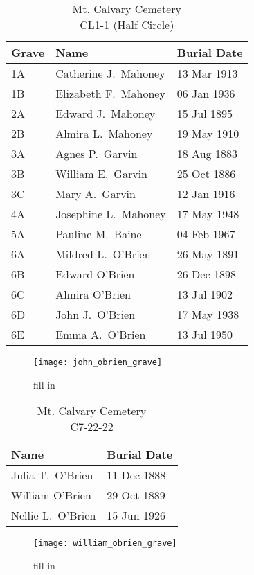\begin{table}[h]
	\centering
	\caption{Mt. Calvary Cemetery \\
		CL1-1 (Half Circle)}
	\begin{tabular}{|l|l|l|}
		\hline
		\textbf{Grave} & \textbf{Name} & \textbf{Burial Date} \\
		\hline
		1A & Catherine J.\ Mahoney & 13 Mar 1913 \\
		\hline
		1B & Elizabeth F.\ Mahoney & 06 Jan 1936 \\
		\hline
		2A & Edward J.\ Mahoney & 15 Jul 1895 \\
		\hline
		2B & Almira L.\ Mahoney & 19 May 1910 \\
		\hline
		3A & Agnes P.\ Garvin & 18 Aug 1883 \\
		\hline
		3B & William E.\ Garvin & 25 Oct 1886 \\
		\hline
		3C & Mary A.\ Garvin & 12 Jan 1916 \\
		\hline
		4A & Josephine L.\ Mahoney & 17 May 1948 \\
		\hline
		5A & Pauline M.\ Baine & 04 Feb 1967 \\
		\hline
		6A & Mildred L.\ O'Brien & 26 May 1891 \\
		\hline
		6B & Edward O'Brien & 26 Dec 1898 \\
		\hline
		6C & Almira O'Brien & 13 Jul 1902 \\
		\hline
		6D & John J.\ O'Brien & 17 May 1938 \\
		\hline
		6E & Emma A.\ O'Brien & 13 Jul 1950 \\
		\hline
	\end{tabular}
\end{table}

\begin{figure}
	\centering
	\texttt{[image: john\_obrien\_grave]}
	\caption{fill in}
\end{figure}

\begin{table}[h]
	\centering
	\caption{Mt. Calvary Cemetery \\
		C7-22-22}
	\begin{tabular}{|l|l|}
		\hline
		\textbf{Name} & \textbf{Burial Date} \\
		\hline
		Julia T.\ O'Brien & 11 Dec 1888 \\
		\hline
		William O'Brien & 29 Oct 1889 \\
		\hline
		Nellie L.\ O'Brien & 15 Jun 1926 \\
		\hline
	\end{tabular}
\end{table}

\begin{figure}
	\centering
	\texttt{[image: william\_obrien\_grave]}
	\caption{fill in}
\end{figure}
